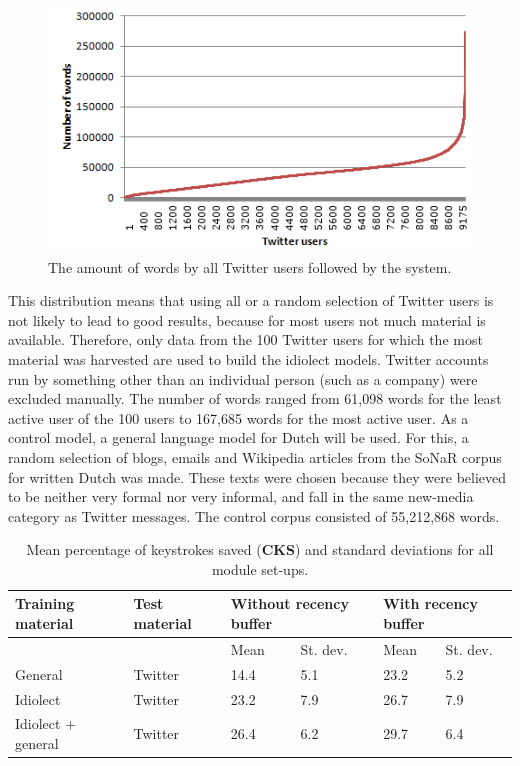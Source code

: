 \documentclass[11pt]{article}
\begin{document}
\begin{figure}[htb] \centering
\includegraphics[scale=0.6]{zipf_twitter}
\caption{The amount of words by all Twitter users followed by the system.}
\label{lcurve}
\end{figure} 

This distribution means that using all or a random selection of Twitter users is not likely to lead to good results, because for most users not much material is available. Therefore, only data from the 100 Twitter users for which the most material was harvested are used to build the idiolect models. Twitter accounts run by something other than an individual person (such as a company) were excluded manually. The number of words ranged from 61,098 words for the least active user of the 100 users to 167,685 words for the most active user. As a control model, a general language model for Dutch will be used. For this, a random selection of blogs, emails and Wikipedia articles from the SoNaR corpus for written Dutch \cite{oostdijk+13} was made. These texts were chosen because they were believed to be neither very formal nor very informal, and fall in the same new-media category as Twitter messages. The control corpus consisted of 55,212,868 words.

\begin{table}[htb] 
\centering
\begin{tabular}{ll|llll} 
Training material&Test material&\multicolumn{2}{l}{Without recency buffer}&\multicolumn{2}{l}{With recency buffer}\\
\hline
&&Mean&St. dev.&Mean&St. dev.\\
General&Twitter&14.4&5.1&23.2&5.2\\
Idiolect&Twitter&23.2&7.9&26.7&7.9\\
Idiolect + general &Twitter&26.4&6.2&29.7&6.4\\
\end{tabular} 
\caption{Mean percentage of keystrokes saved (\textbf{CKS}) and standard deviations for all module set-ups.} \label{twitter_results_cks}
\end{table}
\end{document}
